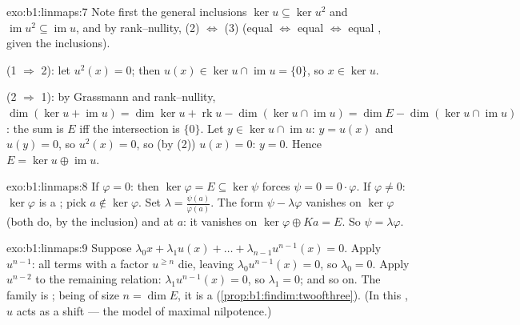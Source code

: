\begin{solution}{exo:b1:linmaps:7}
Note first the general inclusions $\ker u \subseteq \ker u^2$ and
$\operatorname{im} u^2 \subseteq \operatorname{im} u$, and by
rank--nullity, (2) $\iff$ (3) (equal  $\iff$ equal 
$\iff$ equal , given the inclusions).

(1 $\Rightarrow$ 2): let $u^2(x) = 0$; then $u(x) \in \ker u \cap
\operatorname{im} u = \{0\}$, so $x \in \ker u$.

(2 $\Rightarrow$ 1): by Grassmann and rank--nullity, $\dim(\ker u +
\operatorname{im} u) = \dim\ker u + \operatorname{rk} u -
\dim(\ker u \cap \operatorname{im} u) = \dim E - \dim(\ker u \cap
\operatorname{im} u)$: the sum is $E$ iff the intersection is
$\{0\}$. Let $y \in \ker u \cap \operatorname{im} u$: $y = u(x)$ and
$u(y) = 0$, so $u^2(x) = 0$, so (by (2)) $u(x) = 0$: $y = 0$. Hence
$E = \ker u \oplus \operatorname{im} u$.
\end{solution}

\begin{solution}{exo:b1:linmaps:8}
If $\varphi = 0$: then $\ker\varphi = E \subseteq \ker\psi$ forces
$\psi = 0 = 0\cdot\varphi$. If $\varphi \neq 0$: $\ker\varphi$ is a
; pick $a \notin \ker\varphi$. Set $\lambda =
\frac{\psi(a)}{\varphi(a)}$. The form $\psi - \lambda\varphi$
vanishes on $\ker\varphi$ (both do, by the inclusion) and at $a$:
it vanishes on $\ker\varphi \oplus Ka = E$. So $\psi =
\lambda\varphi$.
\end{solution}

\begin{solution}{exo:b1:linmaps:9}
Suppose $\lambda_0 x + \lambda_1 u(x) + \dots + \lambda_{n-1}
u^{n-1}(x) = 0$. Apply $u^{n-1}$: all terms with a factor $u^{\geq
n}$ die, leaving $\lambda_0 u^{n-1}(x) = 0$, so $\lambda_0 = 0$.
Apply $u^{n-2}$ to the remaining relation: $\lambda_1 u^{n-1}(x) =
0$, so $\lambda_1 = 0$; and so on. The family is ; being of size
$n = \dim E$, it is a  (\cref{prop:b1:findim:twoofthree}). (In
this , $u$ acts as a shift --- the model of maximal
nilpotence.)
\end{solution}

